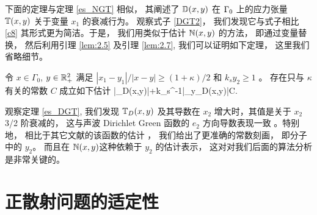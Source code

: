 下面的定理与定理 \ref{es_NGT} 相似， 其阐述了 $\mathbb{D}(x,y)$ 在 $\Gamma_0$ 上的应力张量 $\mathbb{T}(x,y)$ 关于变量 $x_1$ 的衰减行为。 观察式子 \ref{DGT2}， 我们发现它与式子相比 \ref{c8} 其形式更为简洁。于是， 我们用类似于估计 $\mathbb{N}(x,y)$ 的方法， 即通过变量替换， 然后利用引理 \ref{lem:2.5} 及引理 \ref{lem:2.7}, 我们可以证明如下定理， 这里我们省略细节。

\begin{thm}\label{es_DGT}
	令 $x\in\Gamma_0$, $y\in\mathbb{R}_+^2$ 满足 $|x_1-y_1|/|x-y|\ge (1+\kappa)/2$ 和 $k_s y_2\ge 1$ 。 存在只与 $\kappa$ 有关的常数 $C$ 成立如下估计
	\ben
	|\T_D(x,y)|+k_s^{-1}|\na_y\T_D(x,y)|\leq C.
	\een
\end{thm}
\begin{remark}
观察定理 \ref{es_DGT}, 我们发现 $\mathbb{T}_D(x,y)$ 及其导数在 $x_2$ 增大时，其值是关于 $x_2$ 3/2 阶衰减的， 这与声波 Dirichlet Green 函数的 $e_2$ 方向导数表现一致 \cite{RTMhalf_aco} 。特别地， 相比于其它文献的该函数的估计 \cite[Lemma 2.2]{arens1999}， 我们给出了更准确的常数刻画， 即分子中的 $y_2$。 而且在 $\mathbb{N}(x,y )$这种依赖于 $y_2$ 的估计表示， 这对对我们后面的算法分析是非常关键的。
\end{remark}
\section{正散射问题的适定性}


